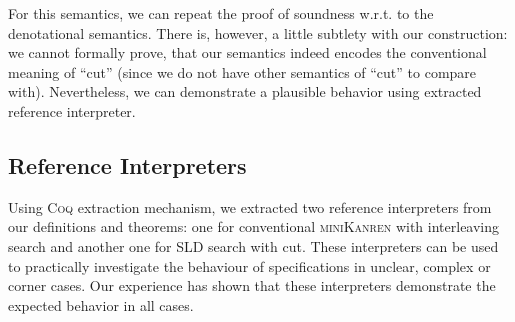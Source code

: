 For this semantics, we can repeat the proof of soundness w.r.t. to the denotational semantics. There is, however, a little subtlety with our construction:
we cannot formally prove, that our semantics indeed encodes the conventional meaning of ``cut'' (since we do not have other semantics of ``cut'' to compare with).
Nevertheless, we can demonstrate a plausible behavior using extracted reference interpreter.

\subsection{Reference Interpreters}

Using \textsc{Coq} extraction mechanism, we extracted two reference interpreters from our definitions and theorems: one for conventional
\textsc{miniKanren} with interleaving search and another one for SLD search with cut. These interpreters can be used to practically investigate the behaviour
of specifications in unclear, complex or corner cases. Our experience has shown that these interpreters demonstrate the expected behavior
in all cases.
